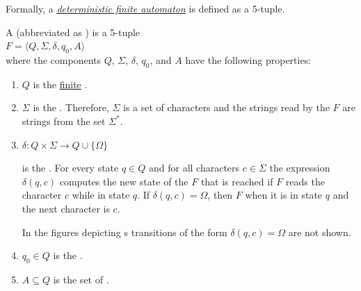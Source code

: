 \noindent
Formally, a \href{http://en.wikipedia.org/wiki/Finite-state_machine}{\emph{deterministic finite automaton}} 
is defined as a 5-tuple.
\begin{Definition}
A  (abbreviated as ) is a 5-tuple 
\\[0.2cm]
\hspace*{1.3cm}
$F = \langle Q, \Sigma, \delta, q_0, A\rangle$
\\[0.2cm]
where the components $Q$, $\Sigma$, $\delta$, $q_0$, and $A$ have the following properties:
\begin{enumerate}
\item $Q$ is the \underline{finite} .
\item $\Sigma$ is the \index{$\Sigma$}.  Therefore, $\Sigma$ is a
      set of characters and 
      the strings read by the  $F$ are strings from the set $\Sigma^*$.
\item $\delta: Q \times \Sigma \rightarrow Q \cup \{ \Omega \}$

      is the  .  For every state $q\in Q$ and for all
      characters $c \in \Sigma$ the expression $\delta(q,c)$ computes the new state of the  $F$
      that is reached if $F$ reads the character $c$ while in state $q$.
      If $\delta(q,c) = \Omega$, then $F$  when it is in state $q$ and the next character
      is $c$. 

      In the figures depicting s transitions of the form $\delta(q, c) = \Omega$ 
      are not shown.
\item $q_0 \in Q$ is the . 
\item $A \subseteq Q$ is the set of . 
      \eox
\end{enumerate}
\end{Definition}

